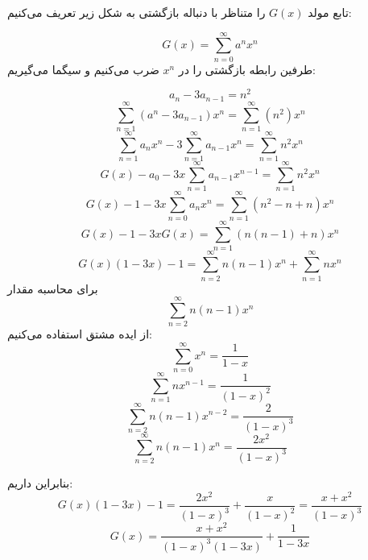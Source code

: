 \p
 تابع مولد $G(x)$ را متناظر با دنباله بازگشتی به شکل زیر تعریف می‌کنیم:
 

            $$G(x) = \sum_{n = 0}^{\infty} a^nx^n$$
            طرفین رابطه بازگشتی را در $x^n$ ضرب می‌کنیم و سیگما می‌گیریم:
            
            $$a_n - 3 a_{n-1} = n^2$$ 
            $$\sum_{n = 1}^{\infty} (a^n - 3a_{n - 1})x^n = \sum_{n = 1}^{\infty} (n^2)x^n$$
                $$\sum_{n = 1}^{\infty} a_nx^n - 3\sum_{n = 1}^{\infty}a_{n-1}x^n = \sum_{n = 1}^{\infty}n^2x^n$$
                $$G(x) - a_0 - 3x\sum_{n = 1}^{\infty} a_{n-1}x^{n-1} = \sum_{n = 1}^{\infty}n^2x^n$$
                $$G(x) - 1 - 3x\sum_{n = 0}^{\infty} a_nx^n = \sum_{n = 1}^{\infty}(n^2 - n + n)x^n$$
                $$G(x) - 1 - 3xG(x) = \sum_{n = 1}^{\infty}(n(n - 1) + n)x^n$$
                $$G(x)(1 - 3x) - 1 = \sum_{n = 2}^{\infty}n(n - 1)x^n + \sum_{n = 1}^{\infty} nx^n$$
                برای محاسبه مقدار
            $$\sum_{n = 2}^{\infty}n(n - 1)x^n$$
            از ایده مشتق استفاده می‌کنیم:
                $$\sum_{n = 0}^{\infty} x^n = \frac{1}{1 - x}$$
                $$\sum_{n = 1}^{\infty} nx^{n - 1} = \frac{1}{(1 - x)^2}$$
                $$\sum_{n = 2}^{\infty} n(n - 1)x^{n - 2} = \frac{2}{(1 - x)^3} $$
                $$\sum_{n = 2}^{\infty} n(n - 1)x^n = \frac{2x^2}{(1 - x)^3}$$

                بنابراین داریم:
                $$G(x)(1 - 3x) - 1 = \frac{2x^2}{(1 - x)^3} + \frac{x}{(1 - x)^2} = \frac{x + x^2}{(1 - x)^3}$$
                $$G(x) = \frac{x + x^2}{(1 - x)^3(1 - 3x)} + \frac{1}{1 - 3x}$$

                